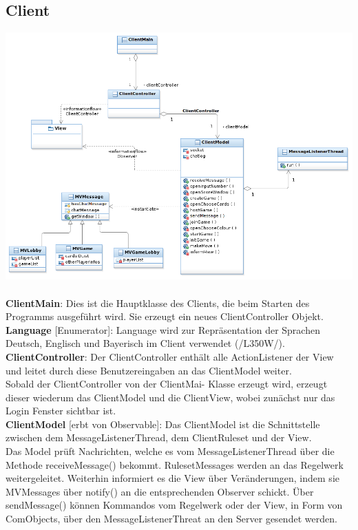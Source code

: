 \documentclass{article}
\begin{document}
\subsection{Client}
\includegraphics[width=\textwidth]{Entwurf_ClientDiagram}
\\ \\

\textbf{ClientMain}: Dies ist die Hauptklasse des Clients, die beim Starten des Programms ausgeführt wird. Sie erzeugt ein neues ClientController Objekt.\\

\textbf{Language} [Enumerator]: Language wird zur Repräsentation der Sprachen Deutsch, Englisch und Bayerisch im Client verwendet (/L350W/). \\

\textbf{ClientController}: Der ClientController enthält alle ActionListener der View und leitet durch diese Benutzereingaben an das ClientModel weiter.\\
Sobald der ClientController von der ClientMai- Klasse erzeugt wird, erzeugt dieser wiederum das ClientModel und die ClientView, wobei zunächst nur das Login Fenster sichtbar ist. \\

\textbf{ClientModel} [erbt von Observable]: Das ClientModel ist die Schnittstelle zwischen dem MessageListenerThread, dem ClientRuleset und der View.\\ 
Das Model prüft Nachrichten, welche es vom MessageListenerThread über die Methode receiveMessage() bekommt. RulesetMessages werden an das Regelwerk weitergeleitet. Weiterhin informiert es die View über Veränderungen, indem sie MVMessages über notify() an die entsprechenden Observer schickt. Über sendMessage() können Kommandos vom Regelwerk oder der View, in Form von ComObjects, über den MessageListenerThreat an den Server gesendet werden.\\
\end{document}
